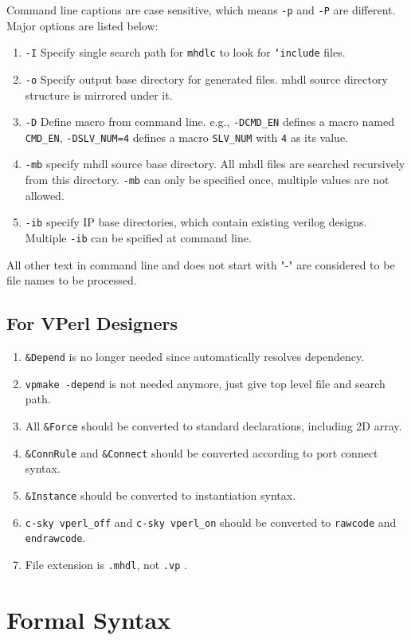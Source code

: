 \documentclass[10pt,oneside]{book}
\begin{document}
Command line captions are case sensitive, which means \texttt{-p} and \texttt{-P}
are different.  Major options are listed below:

\begin{enumerate}
\item \texttt{-I} Specify single search path for \texttt{mhdlc} to look for \texttt{`include}
files.

\item \texttt{-o} Specify output base directory for generated files.  mhdl source
directory structure is mirrored under it.

\item \texttt{-D} Define macro from command line. e.g., \texttt{-DCMD\_EN} defines a
macro named \texttt{CMD\_EN}, \texttt{-DSLV\_NUM=4} defines a macro \texttt{SLV\_NUM} with
\texttt{4} as its value.

\item \texttt{-mb} specify mhdl source base directory.  All mhdl files are
searched recursively from this directory.  \texttt{-mb} can only be
specified once, multiple values are not allowed.

\item \texttt{-ib} specify IP base directories, which contain existing verilog
designs.  Multiple \texttt{-ib} can be spcified at command line.
\end{enumerate}

All other text in command line and does not start with "-" are
considered to be file names to be processed.

\section{For VPerl Designers}
\label{sec:orgd4e6ee2}
\begin{enumerate}
\item \texttt{\&Depend} is no longer needed since automatically resolves
dependency.

\item \texttt{vpmake -depend} is not needed anymore, just give top level file and
search path.

\item All \texttt{\&Force} should be converted to standard declarations, including
2D array.

\item \texttt{\&ConnRule} and \texttt{\&Connect} should be converted according to port
connect syntax.

\item \texttt{\&Instance} should be converted to instantiation syntax.

\item \texttt{c-sky vperl\_off} and \texttt{c-sky vperl\_on} should be converted to
\texttt{rawcode} and \texttt{endrawcode}.

\item File extension is \texttt{.mhdl}, not \texttt{.vp} .
\end{enumerate}


\chapter{Formal Syntax}
\label{sec:orgbcbe461}

\end{document}
